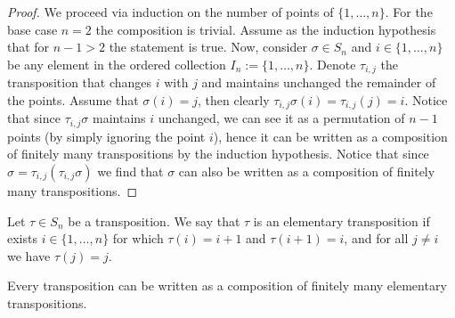 \begin{proof}
We proceed via induction on the number of points of \(\{1, \dots, n\}\). For
the base case \(n = 2\) the composition is trivial. Assume as the induction
hypothesis that for \(n - 1 > 2\) the statement is true. Now, consider
\(\sigma \in S_n\) and \(i \in \{1, \dots, n\}\) be any element in
the ordered collection \(I_n := \{1, \dots, n\}\). Denote \(\tau_{i, j}\) the
transposition that changes \(i\) with \(j\) and maintains unchanged the
remainder of the points. Assume that \(\sigma(i) = j\), then clearly
\(\tau_{i, j} \sigma(i) = \tau_{i, j}(j) = i\). Notice that since \(\tau_{i,
j} \sigma\) maintains \(i\) unchanged, we can see it as a permutation of \(n
- 1\) points (by simply ignoring the point \(i\)), hence it can be written as
a composition of finitely many transpositions by the induction hypothesis.
Notice that since \(\sigma = \tau_{i, j} (\tau_{i, j} \sigma)\) we find that
\(\sigma\) can also be written as a composition of finitely many
transpositions.
\end{proof}

\begin{definition}
Let \(\tau \in S_n\) be a transposition. We say that \(\tau\) is an
elementary transposition if exists \(i \in \{1, \dots, n\}\) for which
\(\tau(i) = i + 1\) and \(\tau(i + 1) = i\), and for all \(j \neq i\) we have
\(\tau(j) = j\).
\end{definition}

\begin{proposition}
Every transposition can be written as a composition of finitely many
elementary transpositions.
\end{proposition}


